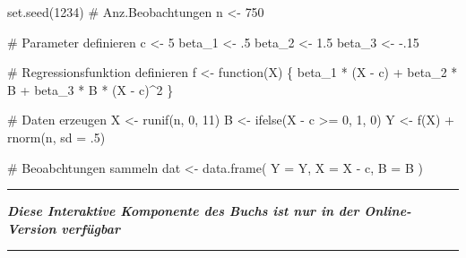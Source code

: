 \documentclass[
  a4paper,
  DIV=11,
  oneside]{scrreprt}
\newenvironment{Shaded}{\begin{snugshade}}{\end{snugshade}}
\newcommand{\AttributeTok}[1]{\textcolor[rgb]{0.40,0.45,0.13}{#1}}
\newcommand{\CommentTok}[1]{\textcolor[rgb]{0.37,0.37,0.37}{#1}}
\newcommand{\ControlFlowTok}[1]{\textcolor[rgb]{0.00,0.23,0.31}{#1}}
\newcommand{\DecValTok}[1]{\textcolor[rgb]{0.68,0.00,0.00}{#1}}
\newcommand{\FloatTok}[1]{\textcolor[rgb]{0.68,0.00,0.00}{#1}}
\newcommand{\FunctionTok}[1]{\textcolor[rgb]{0.28,0.35,0.67}{#1}}
\newcommand{\NormalTok}[1]{\textcolor[rgb]{0.00,0.23,0.31}{#1}}
\newcommand{\OtherTok}[1]{\textcolor[rgb]{0.00,0.23,0.31}{#1}}
\newcommand{\SpecialCharTok}[1]{\textcolor[rgb]{0.37,0.37,0.37}{#1}}
\begin{document}
\begin{Shaded}
\begin{Highlighting}[]
\FunctionTok{set.seed}\NormalTok{(}\DecValTok{1234}\NormalTok{)}
\CommentTok{\# Anz.Beobachtungen}
\NormalTok{n }\OtherTok{\textless{}{-}} \DecValTok{750}

\CommentTok{\# Parameter definieren}
\NormalTok{c }\OtherTok{\textless{}{-}} \DecValTok{5}
\NormalTok{beta\_1 }\OtherTok{\textless{}{-}}\NormalTok{ .}\DecValTok{5}
\NormalTok{beta\_2 }\OtherTok{\textless{}{-}} \FloatTok{1.5}
\NormalTok{beta\_3 }\OtherTok{\textless{}{-}} \SpecialCharTok{{-}}\NormalTok{.}\DecValTok{15}

\CommentTok{\# Regressionsfunktion definieren}
\NormalTok{f }\OtherTok{\textless{}{-}} \ControlFlowTok{function}\NormalTok{(X) \{}
\NormalTok{  beta\_1 }\SpecialCharTok{*}\NormalTok{ (X }\SpecialCharTok{{-}}\NormalTok{ c) }\SpecialCharTok{+}\NormalTok{ beta\_2 }\SpecialCharTok{*}\NormalTok{ B }\SpecialCharTok{+}\NormalTok{ beta\_3 }\SpecialCharTok{*}\NormalTok{ B }\SpecialCharTok{*}\NormalTok{ (X }\SpecialCharTok{{-}}\NormalTok{ c)}\SpecialCharTok{\^{}}\DecValTok{2}
\NormalTok{\}}

\CommentTok{\# Daten erzeugen}
\NormalTok{X }\OtherTok{\textless{}{-}} \FunctionTok{runif}\NormalTok{(n, }\DecValTok{0}\NormalTok{, }\DecValTok{11}\NormalTok{)}
\NormalTok{B }\OtherTok{\textless{}{-}} \FunctionTok{ifelse}\NormalTok{(X }\SpecialCharTok{{-}}\NormalTok{ c }\SpecialCharTok{\textgreater{}=} \DecValTok{0}\NormalTok{, }\DecValTok{1}\NormalTok{, }\DecValTok{0}\NormalTok{)}
\NormalTok{Y }\OtherTok{\textless{}{-}} \FunctionTok{f}\NormalTok{(X) }\SpecialCharTok{+} \FunctionTok{rnorm}\NormalTok{(n, }\AttributeTok{sd =}\NormalTok{ .}\DecValTok{5}\NormalTok{)}

\CommentTok{\# Beoabchtungen sammeln}
\NormalTok{dat }\OtherTok{\textless{}{-}} \FunctionTok{data.frame}\NormalTok{(}
  \AttributeTok{Y =}\NormalTok{ Y, }\AttributeTok{X =}\NormalTok{ X }\SpecialCharTok{{-}}\NormalTok{ c, }\AttributeTok{B =}\NormalTok{ B}
\NormalTok{)}
\end{Highlighting}
\end{Shaded}

\begin{center}\rule{0.5\linewidth}{0.5pt}\end{center}

\textbf{\emph{Diese Interaktive Komponente des Buchs ist nur in der
Online-Version verfügbar}}

\begin{center}\rule{0.5\linewidth}{0.5pt}\end{center}
\end{document}
